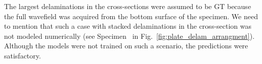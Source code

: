 \begin{sloppypar}
	The largest delaminations in the cross-sections were assumed to be GT because the full wavefield was acquired from the bottom surface of the specimen.
	We need to mention that such a case with stacked delaminations in the cross-section was not modeled numerically (see Specimen~ in Fig.~\ref{fig:plate_delam_arrangment}).
	Although the models were not trained on such a scenario, the predictions were satisfactory.

\end{sloppypar}
